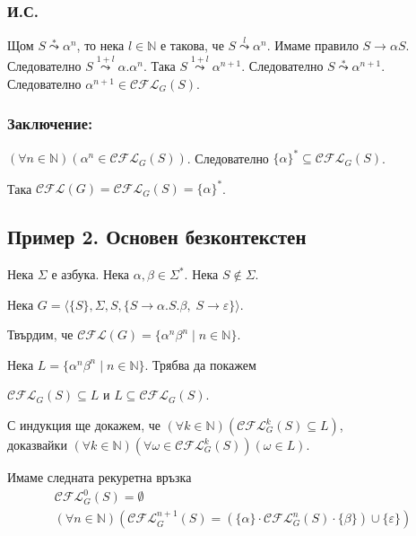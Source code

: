 \documentclass[12pt]{article}
\begin{document}
\subsubsection*{И.С.}
Щом \(S \overset{*}{\leadsto} \alpha^n \), то нека \(l \in \mathbb N\) е такова, че \(S \overset{l}{\leadsto} \alpha^n\).
Имаме правило \(S \to \alpha S\). Следователно \(S \overset{1 + l}{\leadsto} \alpha.\alpha^n\).
Така \(S \overset{1 + l}{\leadsto} \alpha^{n + 1}\). Следователно \(S \overset{*}{\leadsto} \alpha^{n + 1}\).
Следователно \(\alpha^{n + 1} \in \mathcal{CFL}_G(S)\).

\subsubsection*{Заключение:}
\((\forall n \in \mathbb N)(\alpha^n \in \mathcal{CFL}_G(S))\).
Следователно \(\{\alpha\}^* \subseteq \mathcal{CFL}_G(S)\).

Така \(\mathcal{CFL}(G) = \mathcal{CFL}_G(S) = \{\alpha\}^*\).

\subsection*{Пример 2. Основен безконтекстен}

Нека \(\Sigma\) е азбука. Нека \(\alpha, \beta \in \Sigma^*\). Нека \(S \notin \Sigma\).

Нека \(G = \langle \{S\}, \Sigma,  S, \{S \to \alpha.S.\beta,\; S \to \varepsilon\} \rangle\).

Твърдим, че \(\mathcal{CFL}(G) = \{\alpha^n \beta^n \mid n \in \mathbb N\}\).

Нека \(L = \{\alpha^n \beta^n \mid n \in \mathbb N\}\).
Трябва да покажем

\(\mathcal{CFL}_G(S) \subseteq L\) и \(L \subseteq \mathcal{CFL}_G(S)\).

\vspace*{5mm}

\par С индукция ще докажем, че \((\forall k \in \mathbb N)(\mathcal{CFL}_G^k(S) \subseteq L  )\), \\
доказвайки \((\forall k \in \mathbb N)(\forall \omega \in \mathcal{CFL}_G^k(S))(\omega \in L )\).

\vspace*{5mm}

\par Имаме следната рекуретна връзка
\begin{align*}
    \mathcal{CFL}_G^0(S) = \emptyset \\
    (\forall n \in \mathbb N)(\mathcal{CFL}_G^{n + 1}(S) = (\{\alpha\} \cdot \mathcal{CFL}_G^n(S) \cdot \{\beta\}) \cup \{\varepsilon\})
\end{align*}
\end{document}
